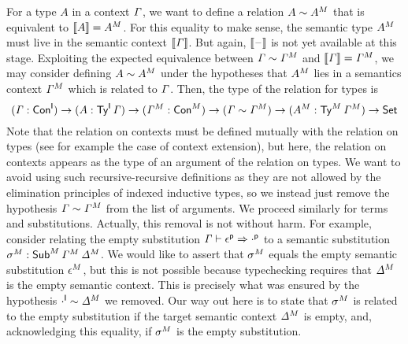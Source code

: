 For a type $A$ in a context $\mathit{\Gamma}$, we want to define a relation
$A\sim {A}^M$ that is equivalent to $\llbracket A\rrbracket={A}^M$.
For this equality to make sense, the semantic type ${A}^M$ must live
in the semantic context $\llbracket\mathit{\Gamma}\rrbracket$. But again, $\llbracket\mathord{\hspace{1pt}\text{--}\hspace{1pt}}\rrbracket$ is not
yet available at this stage. Exploiting the expected equivalence between
$\mathit{\Gamma}\sim{\mathit{\Gamma}}^M$ and $\llbracket\mathit{\Gamma}\rrbracket={\mathit{\Gamma}}^M$, we may consider defining $A\sim{A}^M$ under the
hypotheses that ${A}^M$ lies in a semantics context ${\mathit{\Gamma}}^M$ which is
related to $\mathit{\Gamma}$. Then, the type of the relation for types is
\[
  (\mathit{\Gamma} : {\mathsf{Con}}^{\mathsf{I}})\rightarrow (A : {\mathsf{Ty}}^{\mathsf{I}}\,\mathit{\Gamma}) \rightarrow
  ({\mathit{\Gamma}}^M : {\mathsf{Con}}^M)
  \rightarrow
  (\mathit{\Gamma} \sim {\mathit{\Gamma}}^M)
  \rightarrow
  ({A}^M:{\mathsf{Ty}}^M\,{\mathit{\Gamma}}^M)
  \rightarrow
  \mathsf{Set}
\]
Note that the relation on contexts
must be defined mutually with the relation on types (see for example the case of
context extension), but here, the relation on contexts appears as the type of an
argument of the relation on types.
We want to avoid using such recursive-recursive
definitions as they are not allowed by the elimination principles of indexed inductive types, so we instead just remove the hypothesis
$\mathit{\Gamma}\sim{\mathit{\Gamma}}^M$ from the list of arguments.  We proceed similarly for
terms and substitutions. Actually, this removal is not without harm. For
example, consider relating the empty substitution
$\mathit{\Gamma}\vdash {\epsilon}^{\mathsf{p}} \Rightarrow {\cdot}^{\mathsf{p}} $ to a semantic substitution
${\sigma}^M : {\mathsf{Sub}}^M\,{\mathit{\Gamma}}^M\,{\mathit{\Delta}}^M$. We would like to assert
that ${\sigma}^M$ equals the empty semantic substitution ${\epsilon}^M$, but
this is not possible because typechecking requires that ${\mathit{\Delta}}^M$ is the
empty semantic context. This is precisely what was ensured by the hypothesis
${\cdot}^{\mathsf{I}} \sim {\mathit{\Delta}}^M$ we removed.  Our way out here is to state that ${\sigma}^M$
is related to the empty substitution if the target semantic context ${\mathit{\Delta}}^M$
is empty, and, acknowledging this equality, if ${\sigma}^M$ is the empty
substitution.

